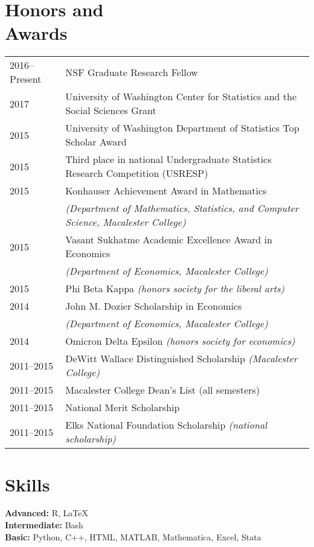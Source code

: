 \documentclass[margin,centered]{res}
\begin{document}
\begin{resume}


\section{\sc Honors and\\ Awards}

\begin{tabular}{@{}p{0.8in}p{4in}}
2016--Present & NSF Graduate Research Fellow\\
2017 & University of Washington Center for Statistics and the Social Sciences Grant\\
2015 & University of Washington Department of Statistics Top Scholar Award\\
2015 & Third place in national Undergraduate Statistics Research Competition (USRESP)\\
2015 & Konhauser Achievement Award in Mathematics \\
&\textit{(Department of Mathematics, Statistics, and Computer Science, Macalester College)}\\
2015 & Vasant Sukhatme Academic Excellence Award in Economics\\& \textit{(Department of Economics, Macalester College)}\\
2015 & Phi Beta Kappa \textit{(honors society for the liberal arts)}\\
2014 & John M. Dozier Scholarship in Economics \\ &\textit{(Department of Economics, Macalester College)}\\
2014 & Omicron Delta Epsilon \textit{(honors society for economics)}\\
2011--2015 & DeWitt Wallace Distinguished Scholarship \textit{(Macalester College)}\\
2011--2015 & Macalester College Dean's List (all semesters)\\
2011--2015 & National Merit Scholarship \\
2011--2015 & Elks National Foundation Scholarship \textit{(national scholarship)}\\
\end{tabular}





\section{\sc Skills}
{\bf Advanced:} R, LaTeX\\
{\bf Intermediate:} Bash\\
{\bf Basic:} Python, C++, HTML, MATLAB, Mathematica, Excel, Stata



\end{resume}
\end{document}
